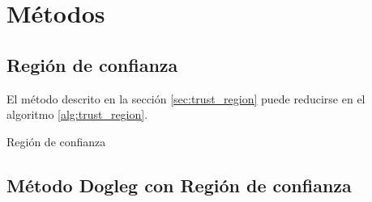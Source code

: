 \pagebreak
\section{Métodos}

\subsection{Región de confianza}

El método descrito en la sección \ref{sec:trust_region} puede reducirse en el algoritmo \ref{alg:trust_region}.

\begin{algorithm}
    \caption{Región de confianza}
    \label{alg:trust_region}
\end{algorithm}

\subsection{Método Dogleg con Región de confianza}

\begin{algorithm}
\end{algorithm}